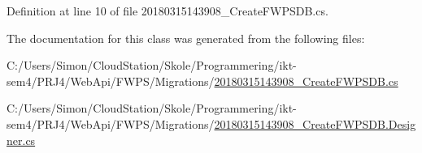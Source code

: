 Definition at line 10 of file 20180315143908\+\_\+\+Create\+F\+W\+P\+S\+D\+B.\+cs.



The documentation for this class was generated from the following files\+:\begin{DoxyCompactItemize}
\item 
C\+:/\+Users/\+Simon/\+Cloud\+Station/\+Skole/\+Programmering/ikt-\/sem4/\+P\+R\+J4/\+Web\+Api/\+F\+W\+P\+S/\+Migrations/\mbox{\hyperlink{20180315143908___create_f_w_p_s_d_b_8cs}{20180315143908\+\_\+\+Create\+F\+W\+P\+S\+D\+B.\+cs}}\item 
C\+:/\+Users/\+Simon/\+Cloud\+Station/\+Skole/\+Programmering/ikt-\/sem4/\+P\+R\+J4/\+Web\+Api/\+F\+W\+P\+S/\+Migrations/\mbox{\hyperlink{20180315143908___create_f_w_p_s_d_b_8_designer_8cs}{20180315143908\+\_\+\+Create\+F\+W\+P\+S\+D\+B.\+Designer.\+cs}}\end{DoxyCompactItemize}

